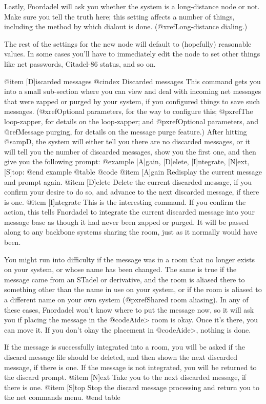 Lastly, Fnordadel will ask you whether the system is
a long-distance node or not.  Make sure you tell the truth here;
this setting affects a number of things, including the method by
which dialout is done.  (@xref{Long-distance dialing}.)

The rest of the settings for the new node will default to
(hopefully) reasonable values.  In some cases you'll have to
immediately edit the node to set other things like net passwords,
Citadel-86 status, and so on.

@item [D]iscarded messages
@cindex Discarded messages
This command gets you into a small sub-section where you can
view and deal with incoming net messages that were zapped or purged
by your system, if you configured things to save such messages.
(@xref{Optional parameters}, for the way to configure this;
@pxref{The loop-zapper}, for details on the loop-zapper;
and @pxref{Optional parameters}, and @ref{Message purging}, for details on
the message purge feature.)  After
hitting @samp{D}, the system will either tell you there are no discarded
messages, or it will tell you the number of
discarded messages, show you the first one, and then give you the
following prompt:
@example
[A]gain, [D]elete, [I]ntegrate, [N]ext, [S]top:
@end example
@table @code
@item [A]gain
Redisplay the current message and prompt again.
@item [D]elete
Delete the current discarded message, if you confirm your desire to
do so, and advance to the next discarded message, if there is one.
@item [I]ntegrate
This is the interesting command.  If you confirm the
action, this tells Fnordadel to integrate the current discarded
message into your message base as though it had never been
zapped or purged.  It will be passed along to any backbone
systems sharing the room, just as it normally would have been.

You might run into difficulty if the message was in a
room that no longer exists on your system, or whose name has
been changed.  The same is true if the message came from an
STadel or derivative, and the room is aliased there to something
other than the name in use on your system, or if the room is
aliased to a different name on your own system (@pxref{Shared room aliasing}).
In any of these cases, Fnordadel won't know where to put the
message now, so it will ask you if placing the message in the
@code{Aide>} room is okay.  Once it's there, you can move it.  If you
don't okay the placement in @code{Aide>}, nothing is done.

If the message is successfully integrated into a room,
you will be asked if the discard message file should be deleted,
and then shown the next discarded message, if there is one.
If the message is not integrated, you will be returned to the
discard prompt.
@item [N]ext
Take you to the next discarded message, if there is one.
@item [S]top
Stop the discard message processing and return you to the net commands menu.
@end table


